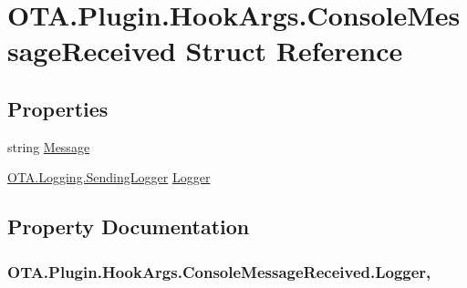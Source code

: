 \hypertarget{struct_o_t_a_1_1_plugin_1_1_hook_args_1_1_console_message_received}{}\section{O\+T\+A.\+Plugin.\+Hook\+Args.\+Console\+Message\+Received Struct Reference}
\label{struct_o_t_a_1_1_plugin_1_1_hook_args_1_1_console_message_received}
\subsection*{Properties}
\begin{DoxyCompactItemize}
\item 
string \hyperlink{struct_o_t_a_1_1_plugin_1_1_hook_args_1_1_console_message_received_a8db7928d2daf448f5eb71297db8bb327}{Message}
\item 
\hyperlink{namespace_o_t_a_1_1_logging_a8bc0baa35da015be032d07e537448cb2}{O\+T\+A.\+Logging.\+Sending\+Logger} \hyperlink{struct_o_t_a_1_1_plugin_1_1_hook_args_1_1_console_message_received_ac113e57fd151ddb393a98a329b478fec}{Logger}
\end{DoxyCompactItemize}


\subsection{Property Documentation}
\hypertarget{struct_o_t_a_1_1_plugin_1_1_hook_args_1_1_console_message_received_ac113e57fd151ddb393a98a329b478fec}{}
\subsubsection[{Logger}]{ O\+T\+A.\+Plugin.\+Hook\+Args.\+Console\+Message\+Received.\+Logger\hspace{0.3cm}{\ttfamily [get]}, {\ttfamily [set]}}\label{struct_o_t_a_1_1_plugin_1_1_hook_args_1_1_console_message_received_ac113e57fd151ddb393a98a329b478fec}
\hypertarget{struct_o_t_a_1_1_plugin_1_1_hook_args_1_1_console_message_received_a8db7928d2daf448f5eb71297db8bb327}{}

